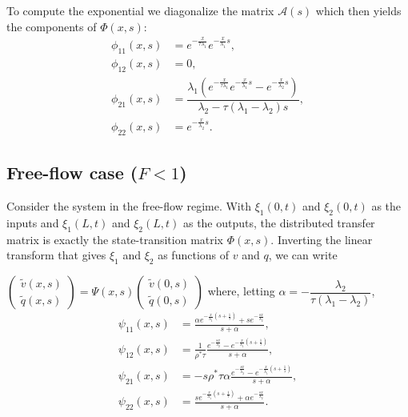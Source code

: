 \documentclass[letterpaper, 10 pt, conference]{ieeeconf}  %
\begin{document}
To compute the exponential we diagonalize the matrix $\mathscr{A}(s)$
which then yields the components of $\Phi(x,s)$:
\begin{subequations} \label{TFv0q0tovxqx}
\begin{align}
\phi_{11}(x,s) &= e^{-\frac{x}{\tau \lambda_1}}e^{-\frac{x}{\lambda_1}s}, \\ 
\phi_{12}(x,s) &= 0, \\
\phi_{21}(x,s) &= \dfrac{\lambda_1 \left( e^{-\frac{x}{\tau \lambda_1}}e^{-\frac{x}{\lambda_1}s} - e^{-\frac{x}{\lambda_2}s}\right)}{\lambda_2 - \tau (\lambda_1 - \lambda_2)s}, \\
\phi_{22}(x,s) &= e^{-\frac{x}{\lambda_2}s}.
\end{align}
\end{subequations}

\subsection{Free-flow case ($F<1$)}
Consider the system in the free-flow regime. With $\xi_1 (0,t)$ and $\xi_2 (0,t)$ as the inputs and $\xi_1(L,t)$ and $\xi_2(L,t)$ as the outputs, the distributed transfer matrix is exactly the state-transition matrix $\Phi(x,s)$. Inverting the linear transform that gives $\xi_1$ and $\xi_2$ as functions of $v$ and $q$, we can write

{\footnotesize
$\label{vqfreeflow}
\begin{pmatrix}
	\widetilde{v}(x,s) \\ 
	\widetilde{q}(x,s)
\end{pmatrix} = 
\Psi(x,s)
\begin{pmatrix}
	\widetilde{v}(0,s) \\ 
	\widetilde{q}(0,s)
\end{pmatrix}
$
}
where, letting {\footnotesize$\alpha = -\dfrac{\lambda_2}{\tau(\lambda_1 - \lambda_2)}$},
\begin{subequations}
\label{psis}
\begin{align}
\psi_{11}(x,s) &= 
\frac{
	\alpha e^{-\frac{x}{\lambda_{1}}\left(s+\frac{1}{\tau}\right)}
		+ s e^{-\frac{sx}{\lambda_{2}}}
}{
	s + \alpha
}, \\
\psi_{12}(x,s) &=
\frac{1}{\rho^* \tau}
\frac{
	e^{-\frac{sx}{\lambda_{2}}}
	-
	e^{-\frac{x}{\lambda_{1}}\left(s+\frac{1}		{\tau}\right)}
}{
	s + \alpha
}, \\
\psi_{21}(x,s) &=
- s \rho^{*} \tau \alpha
\frac{
	e^{-\frac{sx}{\lambda_{2}}}
	-
	e^{-\frac{x}{\lambda_{1}}\left(s+\frac{1}		{\tau}\right)}
}{
	s + \alpha
}, \\
\psi_{22}(x,s) &=
\frac{
	s e^{-\frac{x}{\lambda_{1}}\left(s+\frac{1}{\tau}\right)}
		+ \alpha e^{-\frac{sx}{\lambda_{2}}}
}{
	s + \alpha
}.
\end{align}
\end{subequations}
\end{document}
